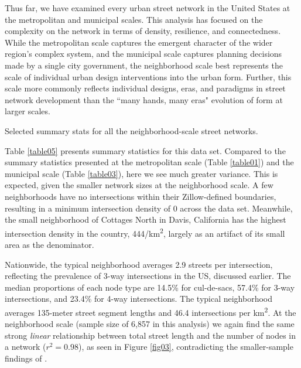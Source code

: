 \documentclass[Afour,sageh,times]{sage/sagej}
\begin{document}
Thus far, we have examined every urban street network in the United States at the metropolitan and municipal scales. This analysis has focused on the complexity on the network in terms of density, resilience, and connectedness. While the metropolitan scale captures the emergent character of the wider region's complex system, and the municipal scale captures planning decisions made by a single city government, the neighborhood scale best represents the scale of individual urban design interventions into the urban form. Further, this scale more commonly reflects individual designs, eras, and paradigms in street network development than the ``many hands, many eras" evolution of form at larger scales.

\begin{table}[h]
\caption{Selected summary stats for all the neighborhood-scale street networks.}
\label{table05}
\end{table}

Table \ref{table05} presents summary statistics for this data set. Compared to the summary statistics presented at the metropolitan scale (Table \ref{table01}) and the municipal scale (Table \ref{table03}), here we see much greater variance. This is expected, given the smaller network sizes at the neighborhood scale. A few neighborhoods have no intersections within their Zillow-defined boundaries, resulting in a minimum intersection density of 0 across the data set. Meanwhile, the small neighborhood of Cottages North in Davis, California has the highest intersection density in the country, 444/km\textsuperscript{2}, largely as an artifact of its small area as the denominator. 

Nationwide, the typical neighborhood averages 2.9 streets per intersection, reflecting the prevalence of 3-way intersections in the US, discussed earlier. The median proportions of each node type are 14.5\% for cul-de-sacs, 57.4\% for 3-way intersections, and 23.4\% for 4-way intersections. The typical neighborhood averages 135-meter street segment lengths and 46.4 intersections per km\textsuperscript{2}. At the neighborhood scale (sample size of 6,857 in this analysis) we again find the same strong \emph{linear} relationship between total street length and the number of nodes in a network ($r^{2}=0.98$), as seen in Figure \ref{fig03}, contradicting the smaller-sample findings of \citet{strano_urban_2013}.
\end{document}
